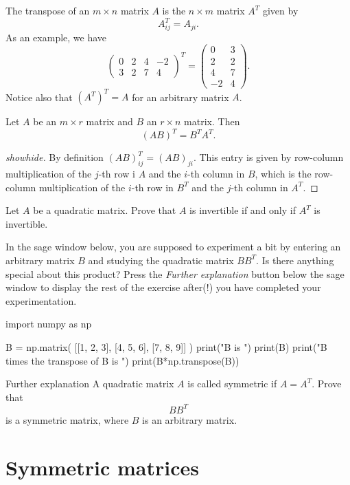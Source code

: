 \documentclass{article}
\begin{document}
The transpose of an $m\times n$ matrix $A$ is the $n\times m$ matrix $A^T$ given by
$$
A^T_{i j} = A_{j i}.
$$
As an example, we have
$$
\begin{pmatrix}
0 & 2 & 4 & -2\\
3 & 2 & 7 & 4
\end{pmatrix}^T =
\begin{pmatrix}
0 & 3\\
2 & 2\\
4 & 7\\
-2 & 4
\end{pmatrix}.
$$
Notice also that $(A^T)^T = A$ for an arbitrary matrix $A$.

\begin{proposition}\label{prop:transformel}
Let $A$ be an $m\times r$ matrix and $B$ an $r\times n$ matrix. Then
$$
(A B)^T = B^T A^T.
$$
\end{proposition}
\begin{proof}[showhide]
  By definition $(A B)^T_{i j} = (A B)_{j i}$. This entry is given
  by row-column multiplication of the $j$-th row i $A$ and 
the $i$-th column in  $B$, which is the row-column multiplication of the
$i$-th row  in $B^T$ and the $j$-th column  in $A^T$.
\end{proof}

\beginshex
Let $A$ be a quadratic matrix. Prove that $A$ is invertible if and only if
$A^T$ is invertible.
\endshex

\beginshex In the sage window below, you are supposed to experiment a
bit by entering an arbitrary matrix $B$ and studying the quadratic
matrix $B B^T$. Is there anything special about this product?  Press
the \emph{Further explanation} button below the sage window to display
the rest of the exercise after(!) you have completed your
experimentation.

\begin{sage}
import numpy as np

B = np.matrix( [[1, 2, 3], [4, 5, 6], [7, 8, 9]] )
print("B is ")
print(B)
print("B times the transpose of B is ")
print(B*np.transpose(B))
\end{sage}

\begin{hideinbutton}{Further explanation}
  A quadratic matrix $A$ is called symmetric if $A = A^T$. Prove that
$$
B B^T
$$
is a symmetric matrix, where $B$ is an arbitrary matrix.
\end{hideinbutton}
\endshex

\section{Symmetric matrices}\label{Sectionsymmat}
\end{document}
